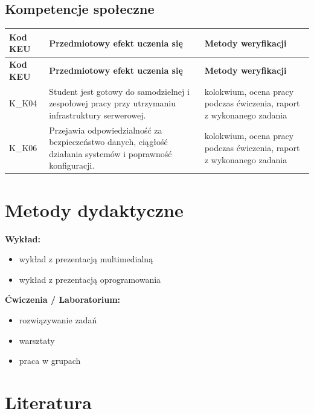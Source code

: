 \documentclass[12pt, a4paper]{article}
\newcommand{\thdrule}{\noalign{\global\setlength{\extrarowheight}{0pt}}}
\newcommand{\thdend}{\noalign{\global\setlength{\extrarowheight}{3pt}}}
\begin{document}
\subsection*{Kompetencje społeczne}
{\scriptsize
\begin{longtable}{m{1.6cm}m{9.0cm}m{4.2cm}}
\thdrule\toprule
\rowcolor{pjatkRed} {\color{white}\footnotesize\textbf{\vphantom{Ag}Kod KEU}} & {\color{white}\footnotesize\textbf{\vphantom{Ag}Przedmiotowy efekt uczenia się}} & {\color{white}\footnotesize\textbf{\vphantom{Ag}Metody weryfikacji}} \\
\midrule\thdend
\endfirsthead
\thdrule\toprule
\rowcolor{pjatkRed} {\color{white}\footnotesize\textbf{\vphantom{Ag}Kod KEU}} & {\color{white}\footnotesize\textbf{\vphantom{Ag}Przedmiotowy efekt uczenia się}} & {\color{white}\footnotesize\textbf{\vphantom{Ag}Metody weryfikacji}} \\
\midrule\thdend
\endhead
  \rowcolor{tableRowLight} K\_K04 & Student jest gotowy do samodzielnej i zespołowej pracy przy utrzymaniu infrastruktury serwerowej. & kolokwium, ocena pracy podczas ćwiczenia, raport z wykonanego zadania \\
  \rowcolor{tableRowAlt} K\_K06 & Przejawia odpowiedzialność za bezpieczeństwo danych, ciągłość działania systemów i poprawność konfiguracji. & kolokwium, ocena pracy podczas ćwiczenia, raport z wykonanego zadania \\
\bottomrule
\end{longtable}}

\section{Metody dydaktyczne}

\textbf{Wykład:}
\begin{itemize}
  \item wykład z prezentacją multimedialną
  \item wykład z prezentacją oprogramowania
\end{itemize}
\vspace{4pt}
\textbf{Ćwiczenia / Laboratorium:}
\begin{itemize}
  \item rozwiązywanie zadań
  \item warsztaty
  \item praca w grupach
\end{itemize}
\vspace{4pt}


\section{Literatura}
\end{document}
